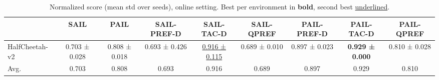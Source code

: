 \begin{table}[t]
\centering
\small
\begin{table}
\caption{Normalized score (mean \pm std over seeds), online setting. Best per environment in \textbf{{bold}}, second best \underline{{underlined}}.}
\label{tab:main_online}
\begin{tabular}{lcccccccc}
\toprule
 & SAIL & PAIL & SAIL-PREF-D & SAIL-TAC-D & SAIL-QPREF & PAIL-PREF-D & PAIL-TAC-D & PAIL-QPREF \\
\midrule
HalfCheetah-v2 & 0.703 ± 0.028 & 0.808 ± 0.018 & 0.693 ± 0.426 & \underline{0.916 ± 0.115} & 0.689 ± 0.010 & 0.897 ± 0.023 & \textbf{0.929 ± 0.000} & 0.810 ± 0.028 \\
Avg. & 0.703 & 0.808 & 0.693 & 0.916 & 0.689 & 0.897 & 0.929 & 0.810 \\
\bottomrule
\end{tabular}
\end{table}
\end{table}

